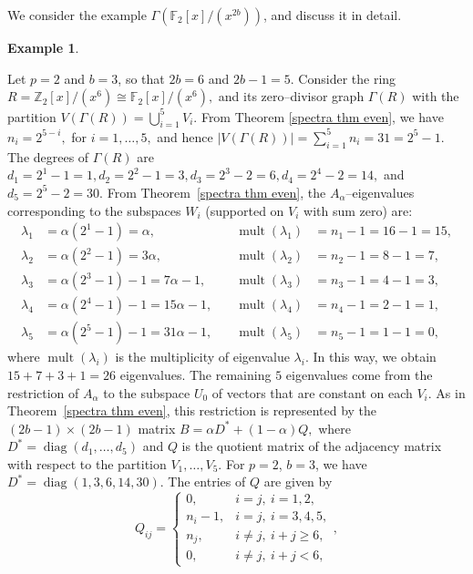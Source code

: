 \documentclass[12pt,twoside]{article}
\newtheorem{example}[theorem]{Example}
\begin{document}
We consider the  example $ \varGamma(\mathbb{F}_2[x]/(x^{2b}))$, and discuss it in detail.
\begin{example}\end{example}
	Let $p=2$ and $b=3$, so that $2b=6$ and $2b-1=5$. Consider the ring $R=\mathbb{Z}_2[x]/(x^6)\cong \mathbb{F}_2[x]/(x^6),$	and its zero--divisor graph $ \varGamma(R)$ with the partition $V( \varGamma(R))=\bigcup_{i=1}^{5}V_i$. From Theorem \ref{spectra thm even}, we have $n_i =2^{5-i}, $ for $ i=1,\dots,5,$ and hence $|V( \varGamma(R))| = \sum_{i=1}^5 n_i = 31 = 2^5 - 1$. The degrees of $ \varGamma(R)$ are $d_1 = 2^1-1 = 1,d_2 = 2^2-1 = 3,d_3 = 2^3-2 = 6,d_4 = 2^4-2 = 14, $ and $d_5 = 2^5-2 = 30.$
	From Theorem~\ref{spectra thm even}, the $A_\alpha$--eigenvalues corresponding
	to the subspaces $W_i$ (supported on $V_i$ with sum zero) are: 
	\[
	\begin{aligned}
		\lambda_1 &= \alpha(2^1-1) = \alpha, 
		&\quad \operatorname{mult}(\lambda_1) &= n_1 - 1 = 16 - 1 = 15,\\
		\lambda_2 &= \alpha(2^2-1) = 3\alpha, 
		&\quad \operatorname{mult}(\lambda_2) &= n_2 - 1 = 8 - 1 = 7,\\
		\lambda_3 &= \alpha(2^3-1) - 1 = 7\alpha - 1,
		&\quad \operatorname{mult}(\lambda_3) &= n_3 - 1 = 4 - 1 = 3,\\
		\lambda_4 &= \alpha(2^4-1) - 1 = 15\alpha - 1,
		&\quad \operatorname{mult}(\lambda_4) &= n_4 - 1 = 2 - 1 = 1,\\
		\lambda_5 &= \alpha(2^5-1) - 1 = 31\alpha - 1,
		&\quad \operatorname{mult}(\lambda_5) &= n_5 - 1 = 1 - 1 = 0,
	\end{aligned}
	\]
	where $ \operatorname{mult}(\lambda_i)$ is the multiplicity of eigenvalue $\lambda_{i}.$ In this way, we obtain  $15+7+3+1 = 26$ eigenvalues. The remaining $5$ eigenvalues come from the restriction of $A_\alpha$ to
	the subspace $U_0$ of vectors that are constant on each $V_i$.
	As in Theorem~\ref{spectra thm even}, this restriction is represented by the
	$(2b-1)\times(2b-1)$ matrix $B=\alpha D^\ast + (1-\alpha)Q,$	where $D^\ast = \operatorname{diag}(d_1,\dots,d_5)$ and $Q$ is the
	quotient matrix of the adjacency matrix with respect to the partition
	$V_1,\dots,V_5$.
	For $p=2$, $b=3$, we have $D^\ast = \operatorname{diag}(1,3,6,14,30)$. 	The entries of $Q$ are given by
	\[
	Q_{ij} =
	\begin{cases}
		0,           & i=j,\ i=1,2,\\[2pt]
		n_i - 1,     & i=j,\ i=3,4,5,\\[2pt]
		n_j,         & i\ne j,\ i+j\ge 6,\\[2pt]
		0,           & i\ne j,\ i+j < 6,
	\end{cases},
	\]
\end{document}

